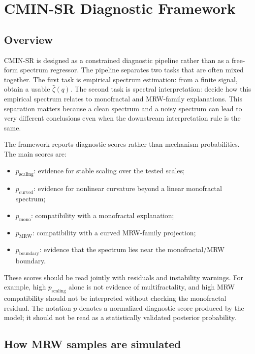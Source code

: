 \section{CMIN-SR Diagnostic Framework}

\subsection{Overview}

CMIN-SR is designed as a constrained diagnostic pipeline rather than as a
free-form spectrum regressor. The pipeline separates two tasks that are often
mixed together. The first task is empirical spectrum estimation: from a finite
signal, obtain a usable \(\widehat{\zeta}(q)\). The second task is spectral
interpretation: decide how this empirical spectrum relates to monofractal and
MRW-family explanations. This separation matters because a clean spectrum and
a noisy spectrum can lead to very different conclusions even when the
downstream interpretation rule is the same.

The framework reports diagnostic scores rather than mechanism probabilities.
The main scores are:
\begin{itemize}
  \item \(p_{\mathrm{scaling}}\): evidence for stable scaling over the tested
  scales;
  \item \(p_{\mathrm{curved}}\): evidence for nonlinear curvature beyond a
  linear monofractal spectrum;
  \item \(p_{\mathrm{mono}}\): compatibility with a monofractal explanation;
  \item \(p_{\mathrm{MRW}}\): compatibility with a curved MRW-family
  projection;
  \item \(p_{\mathrm{boundary}}\): evidence that the spectrum lies near the
  monofractal/MRW boundary.
\end{itemize}
These scores should be read jointly with residuals and instability warnings.
For example, high \(p_{\mathrm{scaling}}\) alone is not evidence of
multifractality, and high MRW compatibility should not be interpreted without
checking the monofractal residual. The notation \(p\) denotes a normalized
diagnostic score produced by the model; it should not be read as a statistically
validated posterior probability.

\subsection{How MRW samples are simulated}

